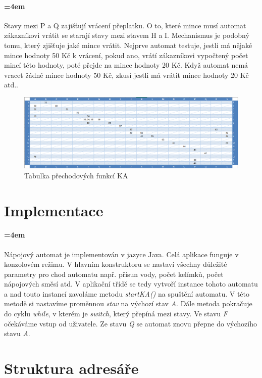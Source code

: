 \documentclass[12pt,a4paper]{article}
\begin{document}
\paragraph{\parindent=4em}{	
	Stavy mezi P a Q zajišťují vrácení přeplatku. O to, které mince musí automat zákazníkovi vrátit se starají stavy mezi stavem H a I. Mechanismus je podobný tomu, který zjišťuje jaké mince vrátit. Nejprve automat testuje, jestli má nějaké mince hodnoty 50 Kč k vrácení, pokud ano, vrátí zákazníkovi vypočtený počet mincí této hodnoty, poté přejde na mince hodnoty 20 Kč. Když automat nemá vracet žádné mince hodnoty 50 Kč, zkusí jestli má vrátit mince hodnoty 20 Kč atd..
}	

\begin{figure}[H]	
	\centering
	\includegraphics[width=\textwidth]{images/tabulka_prechodovych_funkci}
	\caption{Tabulka přechodových funkcí KA}
\end{figure}

\section{Implementace}

\paragraph{\parindent=4em}{	
	Nápojový automat je implementován v jazyce Java. Celá aplikace funguje v konzolovém režimu. V hlavním konstruktoru se nastaví všechny důležité parametry pro chod automatu např. přísun vody, počet kelímků, počet nápojových směsí atd. V aplikační třídě se tedy vytvoří instance tohoto automatu a nad touto instancí zavoláme metodu {\it startKA()} na spuštění automatu. V této metodě si nastavíme proměnnou {\it stav} na výchozí stav {\it A}. Dále metoda pokračuje do cyklu {\it while}, v kterém je {\it switch}, který přepíná mezi stavy. Ve stavu {\it F} očekáváme vstup od uživatele. Ze stavu {\it Q} se automat znovu přepne do výchozího stavu {\it A}.
}

\section{Struktura adresáře}
\end{document}
